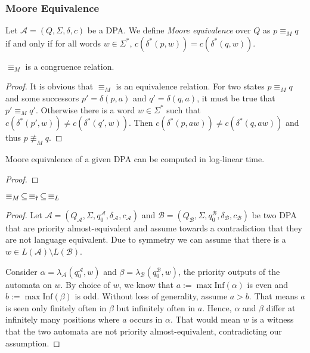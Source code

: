 \subsubsection{Moore Equivalence}

\begin{defn}
	Let $\mathcal{A} = (Q, \Sigma, \delta, c)$ be a DPA. We define \emph{Moore equivalence} over $Q$ as $p \equiv_M q$ if and only if for all words $w \in \Sigma^*$, $c(\delta^*(p, w)) = c(\delta^*(q, w))$.
\end{defn}

\begin{lem}
	$\equiv_M$ is a congruence relation.
\end{lem}

\begin{proof}
	It is obvious that $\equiv_M$ is an equivalence relation. For two states $p \equiv_M q$ and some successors $p' = \delta(p, a)$ and $q' = \delta(q, a)$, it must be true that $p' \equiv_M q'$. Otherwise there is a word $w \in \Sigma^*$ such that $c(\delta^*(p', w)) \neq c(\delta^*(q', w))$. Then $c(\delta^*(p, aw)) \neq c(\delta^*(q, aw))$ and thus $p \not\equiv_M q$.
\end{proof}

\begin{lem}
	Moore equivalence of a given DPA can be computed in log-linear time.
\end{lem}

\begin{proof}
\end{proof}


\vspace{10pt}

\begin{lem}
	$\equiv_M \,\subseteq\, \equiv_\text{\Ankh} \,\subseteq\, \equiv_L$
\end{lem}

\begin{proof}
	Let $\mathcal{A} = (Q_\mathcal{A}, \Sigma, q_0^\mathcal{A}, \delta_\mathcal{A}, c_\mathcal{A})$ and $\mathcal{B} = (Q_\mathcal{B}, \Sigma, q_0^\mathcal{B}, \delta_\mathcal{B}, c_\mathcal{B})$ be two DPA that are priority almost-equivalent and assume towards a contradiction that they are not language equivalent. Due to symmetry we can assume that there is a $w \in L(\mathcal{A}) \setminus L(\mathcal{B})$. 
	
	Consider $\alpha = \lambda_\mathcal{A}(q_0^\mathcal{A}, w)$ and $\beta = \lambda_\mathcal{B}(q_0^\mathcal{B}, w)$, the priority outputs of the automata on $w$. By choice of $w$, we know that $a := \max \text{Inf}(\alpha)$ is even and $b := \max \text{Inf}(\beta)$ is odd. Without loss of generality, assume $a > b$. That means $a$ is seen only finitely often in $\beta$ but infinitely often in $a$. Hence, $\alpha$ and $\beta$ differ at infinitely many positions where $a$ occurs in $\alpha$. That would mean $w$ is a witness that the two automata are not priority almost-equivalent, contradicting our assumption.
	
\end{proof}






